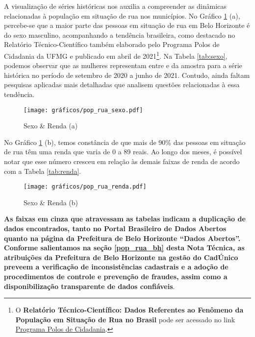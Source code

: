 \documentclass[12pt]{article}
\begin{document}
A visualização de séries históricas nos auxilia a compreender as dinâmicas relacionadas à população em situação de rua nos municípios. No Gráfico \ref{fig:sexo_renda} (a), percebe-se que a maior parte das pessoas em situação de rua em Belo Horizonte é do sexo masculino, acompanhando a tendência brasileira, como destacado no Relatório Técnico-Científico também elaborado pelo Programa Polos de Cidadania da UFMG e publicado em abril de 2021\footnote{O \textbf{Relatório Técnico-Científico: Dados Referentes ao Fenômeno da População em Situação de Rua no Brasil} pode ser acessado no link \href{https://polos.direito.ufmg.br/wp-content/uploads/2021/07/Relatorio-Incontaveis-2021.pdf}{Programa Polos de Cidadania}.}. Na Tabela \ref{tab:sexo}, podemos observar que as mulheres representam entre  e  da amostra para a série histórica no período de setembro de 2020 a junho de 2021. Contudo, ainda faltam pesquisas aplicadas mais detalhadas que analisem questões relacionadas à essa tendência.

\begin{figure}[H]
\centering
	\caption{Sexo \& Renda (a)}
	\texttt{[image: gráficos/pop\_rua\_sexo.pdf]}
	\label{fig:sexo_renda}
\end{figure}

No Gráfico \ref{fig:sexo_renda} (b), temos constância de que mais de 90\% das pessoas em situação de rua têm uma renda que varia de 0 a 89 reais. Ao longo dos meses, é possível notar que esse número cresceu em relação às demais faixas de renda de acordo com a Tabela \ref{tab:renda}.

%
\begin{figure}[H]
\centering
	\caption{Sexo \& Renda (b)}
	\texttt{[image: gráficos/pop\_rua\_renda.pdf]}
	\label{fig:sexo_renda2}
\end{figure}


\textbf{As faixas em cinza que atravessam as tabelas indicam a duplicação de dados encontrados, tanto no Portal Brasileiro de Dados Abertos quanto na página da Prefeitura de Belo Horizonte “Dados Abertos”. Conforme salientamos na seção \ref{pop_rua_bh} desta Nota Técnica, as atribuições da Prefeitura de Belo Horizonte na gestão do CadÚnico preveem a verificação de inconsistências cadastrais e a adoção de procedimentos de controle e prevenção de fraudes, assim como a disponibilização transparente de dados confiáveis}.\\ 
\end{document}
